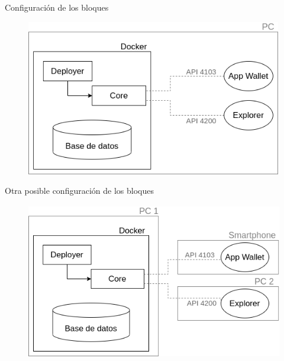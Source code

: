\documentclass[10pt,aspectratio=169,]{beamer}
\begin{document}
\begin{frame}[c]{Configuración de los bloques}
	\begin{figure}
		\centering
		\includegraphics[height=6.8cm]{diagrama_bloquesARK.png}
	\end{figure}
\end{frame}

\begin{frame}[c]{Otra posible configuración de los bloques}
	\begin{figure}
		\centering
		\includegraphics[height=6.8cm]{diagrama_bloquesARK3.png}
	\end{figure}
\end{frame}
\end{document}
